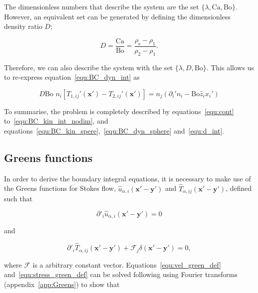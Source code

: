 \documentclass[12pt]{article}
\begin{document}
The dimensionless numbers that describe the system are the set $\{\lambda, \text{Ca}, \text{Bo}\}$. However, an equivalent set can be generated by defining the dimensionless density ratio $D$;

\begin{equation}
\label{equ:dim_dens_rat}
D = \frac{\text{Ca}}{\text{Bo}} = \frac{\rho_{\text{s}} - \rho_{1}}{\rho_{2} - \rho_{1}}.
\end{equation}

Therefore, we can also describe the system with the set $\{\lambda, D, \text{Bo}\}$. This allows us to re-express equation~\ref{equ:BC_dyn_int} as

\begin{equation}
\label{equ:d_int}
D \text{Bo } n_{i} [T_{1, ij}'(\boldsymbol{x'}) - T_{2, ij}'(\boldsymbol{x'})] = n_{j}(\partial_{i}' n_{i} - \text{Bo} \hat{z}_{i} x_{i}')
\end{equation}

To summarise, the problem is completely described by equations~\ref{equ:cont} to~\ref{equ:BC_kin_int_nodim}, and equations~\ref{equ:BC_kin_spere},~\ref{equ:BC_dyn_sphere} and~\ref{equ:d_int}.


\subsection{Greens functions}
\label{subsec:BIE_deriv}

In order to derive the boundary integral equations, it is necessary to make use of the Greens functions \citep{Riley06} for Stokes flow, $\hat{u}_{\alpha,i}(\boldsymbol{x'} - \boldsymbol{y'})$ and $\hat{T}_{\alpha,ij}(\boldsymbol{x'} - \boldsymbol{y'})$, defined such that

\begin{equation}
\label{equ:vel_green_def}
\partial'_{i} \hat{u}_{\alpha,i}(\boldsymbol{x'} - \boldsymbol{y'}) = 0 
\end{equation}

and

\begin{equation}
\label{equ:stress_green_def}
\partial'_{i} \hat{T}_{\alpha,ij}(\boldsymbol{x'} - \boldsymbol{y'}) + \mathcal{F}_{j} \delta(\boldsymbol{x'} - \boldsymbol{y'}) = 0 , 
\end{equation}

where $\boldsymbol{\mathcal{F}}$ is a arbitrary constant vector. Equations~\ref{equ:vel_green_def} and~\ref{equ:stress_green_def} can be solved following \citet{Ladyzhenskaya63} using Fourier transforms (appendix~\ref{app:Greens}) to show that
\end{document}
